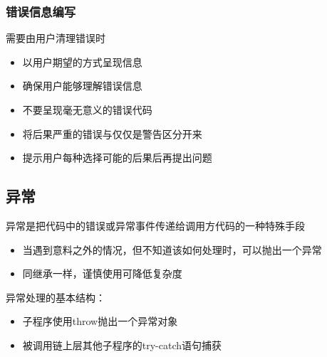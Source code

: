 \subsubsection{错误信息编写}
需要由用户清理错误时
\vspace{-0.8em}
\begin{multicols}{2}
\begin{itemize}
    \item 以用户期望的方式呈现信息
    \item 确保用户能够理解错误信息
    \item 不要呈现毫无意义的错误代码
    \item 将后果严重的错误与仅仅是警告区分开来
    \item 提示用户每种选择可能的后果后再提出问题
\end{itemize}
\end{multicols}
\vspace{-1em}

\subsection{异常}
异常是把代码中的错误或异常事件传递给调用方代码的一种特殊手段
\begin{itemize}
    \item 当遇到意料之外的情况，但不知道该如何处理时，可以抛出一个异常
    \item 同继承一样，谨慎使用可降低复杂度
\end{itemize}

异常处理的基本结构：
\begin{itemize}
    \item 子程序使用throw抛出一个异常对象
    \item 被调用链上层其他子程序的try-catch语句捕获
\end{itemize}

